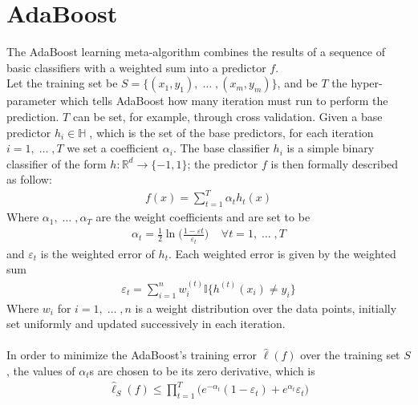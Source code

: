 
\chapter{AdaBoost}
	The AdaBoost learning meta-algorithm combines the results of a sequence of basic classifiers with a weighted sum into a predictor $f$. \\
	Let the training set be $S=\lbrace (x_{1}, y_{1}),\; \dots\;, (x_{m}, y_{m}) \rbrace$, and be $T$ the hyper-parameter which tells AdaBoost how many iteration must run to perform the prediction. $T$ can be set, for example, through cross validation. Given a base predictor $h_{i} \in \mathbb{H}\;$, which is the set of the base predictors, for each iteration $i = 1,\;\dots\;,T$ we set a coefficient $\alpha_{i}$. The base classifier $h_{i}$ is a simple binary classifier of the form $h:\mathbb{R}^{d}\to\lbrace-1, 1\rbrace$; the  predictor $f$ is then formally described as follow:
	\begin{align*}
		f(x) = \sum_{t=1}^{T}\alpha_{t}h_{t}(x)
	\end{align*}
	Where $\alpha_{1},\;\dots\;,\alpha_{T}$ are the weight coefficients and are set to be
	\begin{align}
		\label{eq:alpha_def}
		\alpha_{t} = \frac{1}{2}\ln \Big( \frac{1-\varepsilon{t}}{\varepsilon_{t}} \Big) \;\;\;\; \forall t=1,\;\dots\;,T
	\end{align}
	and $\varepsilon_{t}$ is the weighted error of $h_{t}$. Each weighted error is given by the weighted sum
	\begin{align*}
		\varepsilon_{t} = \sum_{i=1}^{n} w_{i}^{(t)}\mathbb{I}\big\lbrace h^{(t)}(x_{i}) \neq y_{i} \big\rbrace
	\end{align*}
	Where $w_{i}$ for $i = 1,\;\dots\;, n$ is a weight distribution over the data points, initially set uniformly and updated successively in each iteration.\\\\
	In order to minimize the AdaBoost's training error $\hat{\ell}(f)$ over the training set $S$, the values of $\alpha_{t}$s are chosen to be its zero derivative, which is
	\begin{align*}
		\hat{\ell}_{S}(f) \leq \prod_{t=1}^{T}\big( e^{-\alpha_{t}}(1-\varepsilon_{t}) + e^{\alpha_{t}}\varepsilon_{t} \big)
	\end{align*}

